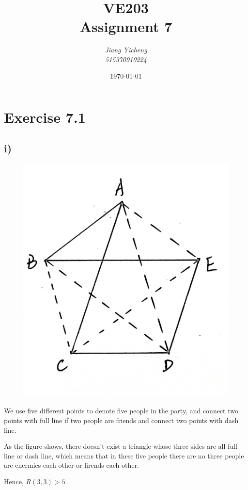 \documentclass[a4paper,12pt,titlepage]{article}
\author{\textit{Jiang Yicheng}\\\textit{515370910224}}
\title{\textbf{VE203\\
		Assignment 7}}
\date{\today}
\begin{document}
\maketitle

\section*{Exercise 7.1} 
\subsection*{i)}
\begin{figure}[H]
	\centering
	\includegraphics[scale=0.1]{1.jpg}
\end{figure}
We use five different points to denote five people in the party, and connect two points with full line if two people are friends and connect two points with dash line.
 
As the figure shows, there doesn't exist a triangle whose three sides are all full line or dash line, which means that in these five people there are no three people are enermies each other or firends each other. 

Hence, $R(3,3)>5$.
\end{document}
